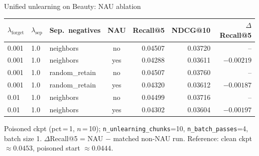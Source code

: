 \begin{frame}{Unified unlearning on Beauty: NAU ablation}
  \begin{table}
    \centering
    \footnotesize
    \begin{tabular}{l l l c r r r}
      \hline
      $\lambda_{\text{forget}}$ & $\lambda_{\text{sep}}$ & Sep.\ negatives & NAU & Recall@5 & NDCG@10 & $\Delta$Recall@5 \\
      \hline
      0.001 & 1.0 & neighbors      & no  & 0.04507 & 0.03720 & --        \\
      0.001 & 1.0 & neighbors      & yes & 0.04288 & 0.03611 & $-0.00219$ \\[2pt]
      0.001 & 1.0 & random\_retain & no  & 0.04507 & 0.03760 & --        \\
      0.001 & 1.0 & random\_retain & yes & 0.04320 & 0.03612 & $-0.00187$ \\[2pt]
      0.01  & 1.0 & neighbors      & no  & 0.04499 & 0.03716 & --        \\
      0.01  & 1.0 & neighbors      & yes & 0.04302 & 0.03604 & $-0.00197$ \\
      \hline
    \end{tabular}
  \end{table}

  \medskip
  {\scriptsize
    Poisoned ckpt (pct\,=\,1, $n$\,=\,10); \texttt{n\_unlearning\_chunks}=10,
    \texttt{n\_batch\_passes}=4, batch size 1.
    $\Delta$Recall@5 = NAU $-$ matched non-NAU run.
    Reference: clean ckpt $\approx 0.0453$, poisoned start $\approx 0.0444$.}
\end{frame}
